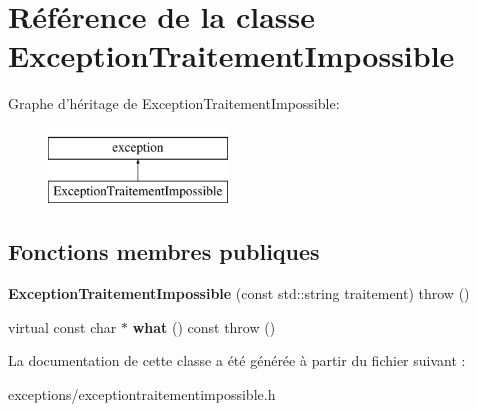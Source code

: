 \hypertarget{class_exception_traitement_impossible}{\section{Référence de la classe Exception\+Traitement\+Impossible}
\label{class_exception_traitement_impossible}
}
Graphe d'héritage de Exception\+Traitement\+Impossible\+:\begin{figure}[H]
\begin{center}
\leavevmode
\includegraphics[height=2.000000cm]{class_exception_traitement_impossible}
\end{center}
\end{figure}
\subsection*{Fonctions membres publiques}
\begin{DoxyCompactItemize}
\item 
\hypertarget{class_exception_traitement_impossible_a77e7bfa4e23591127f6e2f026bb43fca}{{\bfseries Exception\+Traitement\+Impossible} (const std\+::string traitement)  throw ()}\label{class_exception_traitement_impossible_a77e7bfa4e23591127f6e2f026bb43fca}

\item 
\hypertarget{class_exception_traitement_impossible_a15efd9c0e153be816054bcc01b959a10}{virtual const char $\ast$ {\bfseries what} () const   throw ()}\label{class_exception_traitement_impossible_a15efd9c0e153be816054bcc01b959a10}

\end{DoxyCompactItemize}


La documentation de cette classe a été générée à partir du fichier suivant \+:\begin{DoxyCompactItemize}
\item 
exceptions/exceptiontraitementimpossible.\+h\end{DoxyCompactItemize}
